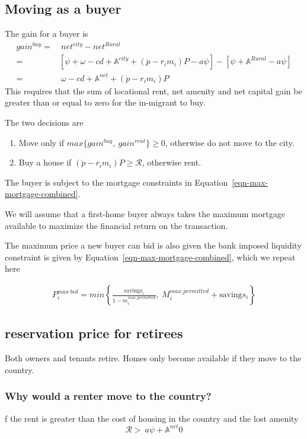 \subsection{Moving as a buyer}
The gain for a buyer is 
\begin{align}
gain^{buy}=&\ net^{city}-net^{Rural}\nonumber\\
=&\left[\psi+\omega-cd+\mathbb{A}^{city}+(\dot p-r_im_i)P-a\psi\right]-\left[\psi+\mathbb{A}^{Rural}-a\psi\right] \nonumber\\
=&\ \omega-cd+\mathbb{A}^{net}+(\dot p-r_im_i)P  \label{eq-move-to-buy}
\end{align}
This requires that the sum of  locational rent, net amenity and net capital gain be greater than or equal to zero for the in-migrant to buy.

The two decisions  are 
\begin{enumerate}
    \item Move only if $max\{gain^{buy},\ gain^{rent}\} \ge 0$, otherwise do not move to the city.
    
    \item Buy a house if $(\dot p-r_im_i)P\ge  \mathcal{R}$, otherwise rent.
\end{enumerate}

The buyer is subject to the mortgage constraints in Equation~\ref{eqn-max-mortgage-combined}.

We will assume that a first-home buyer always takes the maximum mortgage available to maximize the financial return on the transaction. 

The maximum price a new buyer can bid is also given the bank imposed liquidity constraint is given by Equation~\ref{eqn-max-mortgage-combined}, which we repeat here


\begin{align}
P_i^{max\ bid}= min \left\{\frac{\mathrm{savings}_i}{1-m_i^{max\_permitted}},\  M_i^{max\_permitted} + \mathrm{saving}s_i  \right\}   \nonumber  
\end{align}


\subsection{reservation price for retirees}
Both owners and tenants retire. Homes only become available if they move to the country. 



\subsubsection{Why would a renter move to the country?} 
f the rent is greater than the cost of housing in the country and the lost amenity
\[\mathcal{R} > \ a\psi+ \mathbb{A}^{net}0\]


